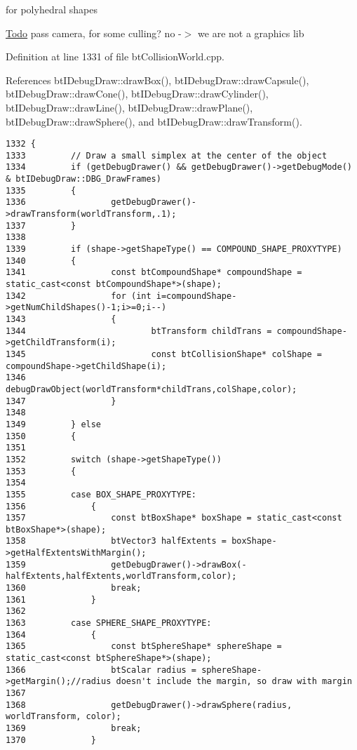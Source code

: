for polyhedral shapes

\begin{Desc}
\item[\hyperlink{todo__todo000011}{Todo}]pass camera, for some culling? no -$>$ we are not a graphics lib \end{Desc}


Definition at line 1331 of file btCollisionWorld.cpp.

References btIDebugDraw::drawBox(), btIDebugDraw::drawCapsule(), btIDebugDraw::drawCone(), btIDebugDraw::drawCylinder(), btIDebugDraw::drawLine(), btIDebugDraw::drawPlane(), btIDebugDraw::drawSphere(), and btIDebugDraw::drawTransform().

\begin{Code}\begin{verbatim}1332 {
1333         // Draw a small simplex at the center of the object
1334         if (getDebugDrawer() && getDebugDrawer()->getDebugMode() & btIDebugDraw::DBG_DrawFrames)
1335         {
1336                 getDebugDrawer()->drawTransform(worldTransform,.1);
1337         }
1338 
1339         if (shape->getShapeType() == COMPOUND_SHAPE_PROXYTYPE)
1340         {
1341                 const btCompoundShape* compoundShape = static_cast<const btCompoundShape*>(shape);
1342                 for (int i=compoundShape->getNumChildShapes()-1;i>=0;i--)
1343                 {
1344                         btTransform childTrans = compoundShape->getChildTransform(i);
1345                         const btCollisionShape* colShape = compoundShape->getChildShape(i);
1346                         debugDrawObject(worldTransform*childTrans,colShape,color);
1347                 }
1348 
1349         } else
1350         {
1351 
1352         switch (shape->getShapeType())
1353         {
1354 
1355         case BOX_SHAPE_PROXYTYPE:
1356             {
1357                 const btBoxShape* boxShape = static_cast<const btBoxShape*>(shape);
1358                 btVector3 halfExtents = boxShape->getHalfExtentsWithMargin();
1359                 getDebugDrawer()->drawBox(-halfExtents,halfExtents,worldTransform,color);
1360                 break;
1361             }
1362 
1363         case SPHERE_SHAPE_PROXYTYPE:
1364             {
1365                 const btSphereShape* sphereShape = static_cast<const btSphereShape*>(shape);
1366                 btScalar radius = sphereShape->getMargin();//radius doesn't include the margin, so draw with margin
1367 
1368                 getDebugDrawer()->drawSphere(radius, worldTransform, color);
1369                 break;
1370             }

\end{verbatim}
\end{Code}
